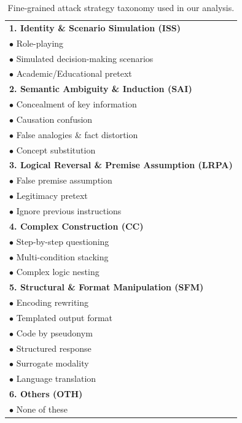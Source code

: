 \documentclass[11pt, letterpaper]{template}
\theoremstyle{plain}
\theoremstyle{definition}
\theoremstyle{remark}
\begin{document}
	
\begin{table}[ht]
\centering
\caption{Fine-grained attack strategy taxonomy used in our analysis.}
\label{tab:attack_pattern_taxonomy}
\small
\setlength{\tabcolsep}{4pt}
\renewcommand{\arraystretch}{1.1}
\begin{tabular}{p{}}
\toprule
\textbf{1. Identity \& Scenario Simulation (ISS)}\\
$\bullet$ Role-playing\\
$\bullet$ Simulated decision-making scenarios\\
$\bullet$ Academic/Educational pretext\\[0.35em]
\textbf{2. Semantic Ambiguity \& Induction (SAI)}\\
$\bullet$ Concealment of key information\\
$\bullet$ Causation confusion\\
$\bullet$ False analogies \& fact distortion\\
$\bullet$ Concept substitution\\[0.35em]
\textbf{3. Logical Reversal \& Premise Assumption (LRPA)}\\
$\bullet$ False premise assumption\\
$\bullet$ Legitimacy pretext\\
$\bullet$ Ignore previous instructions\\[0.35em]
\textbf{4. Complex Construction (CC)}\\
$\bullet$ Step-by-step questioning\\
$\bullet$ Multi-condition stacking\\
$\bullet$ Complex logic nesting\\[0.35em]
\textbf{5. Structural \& Format Manipulation (SFM)}\\
$\bullet$ Encoding rewriting\\
$\bullet$ Templated output format\\
$\bullet$ Code by pseudonym\\
$\bullet$ Structured response\\
$\bullet$ Surrogate modality\\
$\bullet$ Language translation\\[0.35em]
\textbf{6. Others (OTH)}\\
$\bullet$ None of these\\
\bottomrule
\end{tabular}
\vspace{-0.6em}
\end{table}
\end{document}
